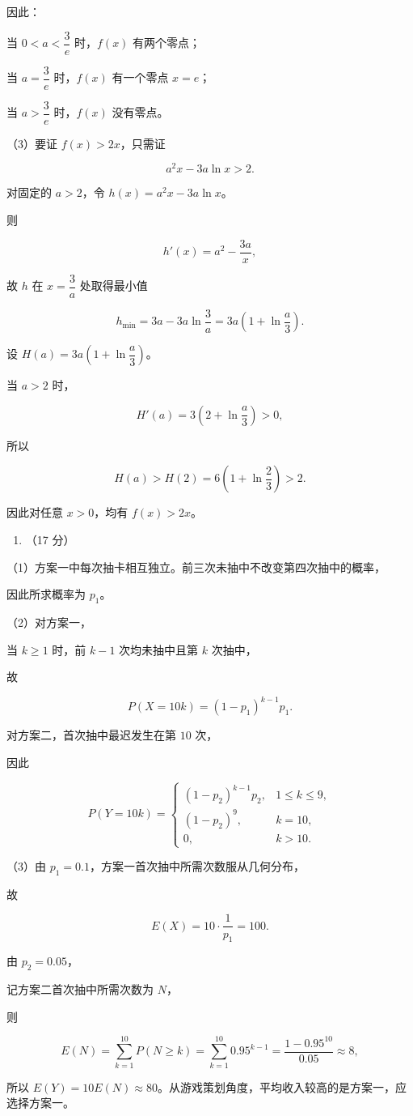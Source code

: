 \documentclass[UTF8,12pt,a4paper]{ctexart}
\renewcommand{\labelenumi}{\arabic{enumi}.}
\providecommand{\tightlist}{%
  \setlength{\itemsep}{0pt}\setlength{\parskip}{0pt}}
\begin{document}
因此：

当 \(0<a<\dfrac3e\) 时，\(f(x)\) 有两个零点；

当 \(a=\dfrac3e\) 时，\(f(x)\) 有一个零点 \(x=e\)；

当 \(a>\dfrac3e\) 时，\(f(x)\) 没有零点。

（3）要证 \(f(x)>2x\)，只需证

\[
   a^2x-3a\ln x>2.
   \]

对固定的 \(a>2\)，令 \(h(x)=a^2x-3a\ln x\)。

则

\[
   h'(x)=a^2-\dfrac{3a}{x},
   \]

故 \(h\) 在 \(x=\dfrac3a\) 处取得最小值

\[
   h_{\min}=3a-3a\ln\frac3a=3a\left(1+\ln\frac a3\right).
   \]

设 \(H(a)=3a\left(1+\ln\dfrac a3\right)\)。

当 \(a>2\) 时，

\[
   H'(a)=3\left(2+\ln\frac a3\right)>0,
   \]

所以

\[
   H(a)>H(2)=6\left(1+\ln\frac23\right)>2.
   \]

因此对任意 \(x>0\)，均有 \(f(x)>2x\)。

\begin{enumerate}
\def\labelenumi{\arabic{enumi}.}
\setcounter{enumi}{18}
\tightlist
\item
  （17 分）
\end{enumerate}

（1）方案一中每次抽卡相互独立。前三次未抽中不改变第四次抽中的概率，

因此所求概率为 \(p_1\)。

（2）对方案一，

当 \(k\ge1\) 时，前 \(k-1\) 次均未抽中且第 \(k\) 次抽中，

故

\[
   P(X=10k)=(1-p_1)^{k-1}p_1.
   \]

对方案二，首次抽中最迟发生在第 \(10\) 次，

因此

\[
   P(Y=10k)=
   \begin{cases}
   (1-p_2)^{k-1}p_2,&1\le k\le9,\\
   (1-p_2)^9,&k=10,\\
   0,&k>10.
   \end{cases}
   \]

（3）由 \(p_1=0.1\)，方案一首次抽中所需次数服从几何分布，

故

\[
   E(X)=10\cdot\frac1{p_1}=100.
   \]

由 \(p_2=0.05\)，

记方案二首次抽中所需次数为 \(N\)，

则

\[
   E(N)=\sum_{k=1}^{10}P(N\ge k)
   =\sum_{k=1}^{10}0.95^{k-1}
   =\dfrac{1-0.95^{10}}{0.05}\approx8,
   \]

所以 \(E(Y)=10E(N)\approx80\)。从游戏策划角度，平均收入较高的是方案一，应选择方案一。
\end{document}
